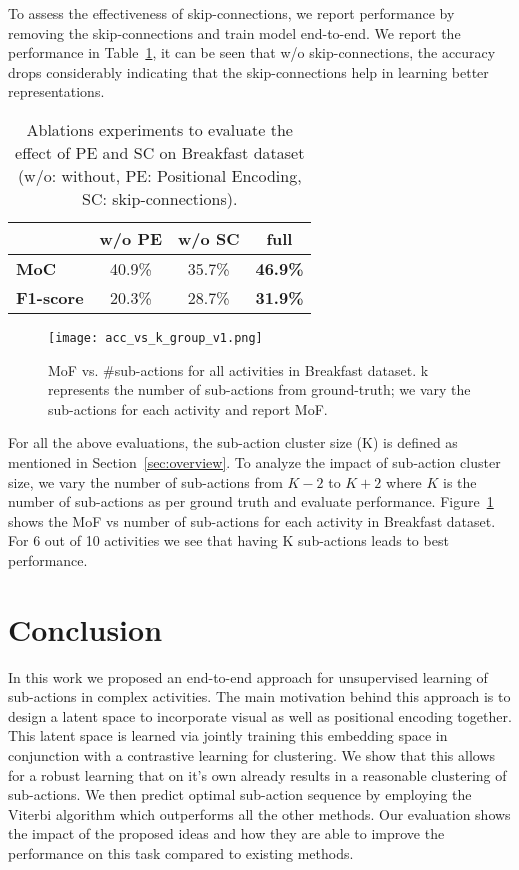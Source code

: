 \documentclass[final]{cvpr}
\begin{document}
 To assess the effectiveness of skip-connections, we report performance by removing the skip-connections and train model end-to-end. We report the performance in Table~\ref{tab:ablation}, it can be seen that w/o skip-connections, the accuracy drops considerably indicating that the skip-connections help in learning better representations.


\begin{table}[h]
 \caption{{\small Ablations experiments to evaluate the effect of PE and SC on Breakfast dataset (w/o: without, PE: Positional Encoding, SC: skip-connections).} 
 }
    \label{tab:ablation}
    \centering
    \begin{tabular}{l|cc|c}
    \toprule
     & \textbf{w/o PE} & \textbf{w/o SC} & \textbf{full} \\
     \midrule
     \textbf{MoC} & 40.9\% & 35.7\% & \textbf{46.9\%} \\
     \textbf{F1-score} & 20.3\% & 28.7\%  & \textbf{31.9\%} \\
    \bottomrule
    \end{tabular}
\end{table}

\begin{figure}
  \texttt{[image: acc\_vs\_k\_group\_v1.png]}
  \caption{{\small MoF vs. \#sub-actions for all activities in Breakfast dataset. k represents the number of sub-actions from ground-truth; we vary the sub-actions for each activity and report MoF.
  }}\vspace{-0.2cm}
 \label{fig:ablation_acc_vs_act}
\end{figure}

 For all the above evaluations, the sub-action cluster size (K) is defined as mentioned in Section~\ref{sec:overview}. To analyze the impact of sub-action cluster size, we vary the number of sub-actions from $K-2$ to $K+2$ where $K$ is the number of sub-actions as per ground truth and evaluate performance. Figure~\ref{fig:ablation_acc_vs_act} shows the MoF vs number of sub-actions for each activity in Breakfast dataset. For 6 out of 10 activities we see that having K sub-actions leads to best performance.


\section{Conclusion}
In this work we proposed an end-to-end approach for unsupervised learning of sub-actions in complex activities. The main motivation behind this approach is to design a latent space to incorporate visual as well as positional encoding together. This latent space is learned via jointly training this embedding space in conjunction with a contrastive learning for clustering. We show that this allows for a robust learning that on it's own already results in a reasonable clustering of sub-actions. We then predict optimal sub-action sequence by employing the Viterbi algorithm which outperforms all the other methods. Our evaluation shows the impact of the proposed ideas and how they are able to improve the performance on this task compared to existing methods.

{\small


}
\end{document}
